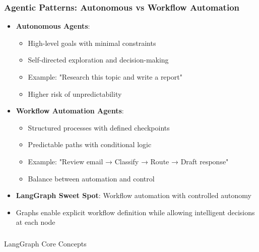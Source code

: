 \begin{frame}[fragile]\frametitle{Agentic Patterns: Autonomous vs Workflow Automation}
      \begin{itemize}
        \item \textbf{Autonomous Agents}:
        \begin{itemize}
            \item High-level goals with minimal constraints
            \item Self-directed exploration and decision-making
            \item Example: "Research this topic and write a report"
            \item Higher risk of unpredictability
        \end{itemize}
        \item \textbf{Workflow Automation Agents}:
        \begin{itemize}
            \item Structured processes with defined checkpoints
            \item Predictable paths with conditional logic
            \item Example: "Review email → Classify → Route → Draft response"
            \item Balance between automation and control
        \end{itemize}
        \item \textbf{LangGraph Sweet Spot}: Workflow automation with controlled autonomy
        \item Graphs enable explicit workflow definition while allowing intelligent decisions at each node
      \end{itemize}
\end{frame}

\begin{frame}[fragile]\frametitle{}
\begin{center}
{\Large LangGraph Core Concepts}
\end{center}
\end{frame}

